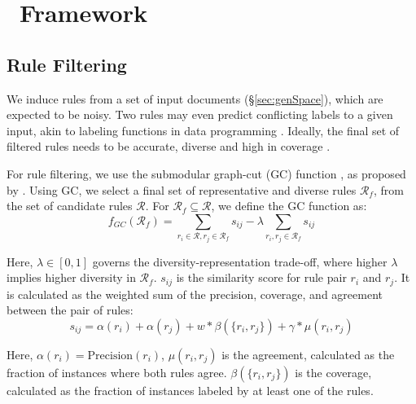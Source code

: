 \section{\our~Framework}
\label{sec:method}

\subsection{Rule Filtering}
\label{ruleFiltering}

We induce rules from a set of input documents (\S \ref{sec:genSpace}), which are expected to be noisy.  Two rules may even predict conflicting labels to a given input, akin to labeling functions in data programming \cite{DBLP:journals/corr/abs-1711-10160ratner,zhang2022survey}. Ideally, the final set of filtered rules needs to be accurate, diverse and high in coverage \cite{bajpai-etal-2024-fair}. 


For rule filtering, we use the submodular graph-cut (GC) function \cite{kothawade2021prism}, as proposed by \citet{bajpai-etal-2024-fair}. Using GC, we select a final set of representative and diverse rules $\mathcal{R}_{f}$, from the set of candidate rules $\mathcal{R}$. For $\mathcal{R}_{f} \subseteq \mathcal{R}$, we define the GC function as:
$$ f_{GC}(\mathcal{R}_{f})=\sum_{r_{i} \in \mathcal{R}, r_{j} \in \mathcal{R}_{f}} s_{ij}-\lambda \sum_{r_{i},r_{j}\in \mathcal{R}_{f}}s_{ij} $$

Here, $\lambda \in [0,1]$ governs the diversity-representation trade-off, where higher $\lambda $ implies higher diversity in $\mathcal{R}_{f}$. $s_{ij}$ is the similarity score for rule pair $r_i$ and $r_j$. It is calculated as the weighted sum of the precision, coverage, and agreement between the pair of rules:
$$s_{ij} = \alpha(r_i)+\alpha(r_j)+w*\beta(\{r_i, r_j\}) + \gamma*\mu(r_i,r_j)$$

Here, $\alpha(r_i)=\text{Precision}(r_i)$, $\mu(r_i,r_j)$ is the agreement, calculated as the fraction of instances where both rules agree. $\beta(\{r_i, r_j\})$ is the coverage, calculated as the fraction of instances labeled by at least one of the rules.  %

